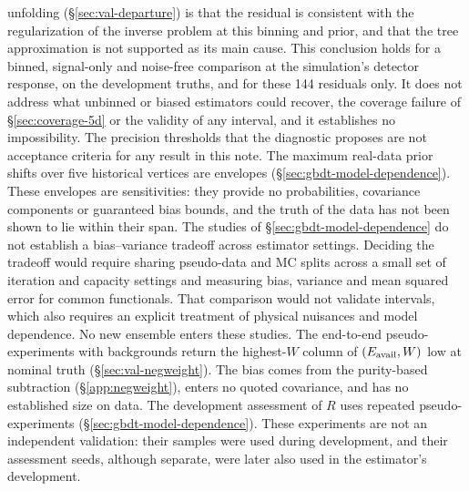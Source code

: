 unfolding (\S\ref{sec:val-departure}) is that the residual is consistent with the regularization of the inverse problem at this binning and prior, and that the tree approximation is not supported as its main cause. This conclusion holds for a binned, signal-only and noise-free comparison at the simulation's detector response, on the development truths, and for these 144 residuals only. It does not address what unbinned or biased estimators could recover, the coverage failure of \S\ref{sec:coverage-5d} or the validity of any interval, and it establishes no impossibility. The precision thresholds that the diagnostic proposes are not acceptance criteria for any result in this note. The maximum real-data prior shifts over five historical vertices are envelopes (\S\ref{sec:gbdt-model-dependence}). These envelopes are sensitivities: they provide no probabilities, covariance components or guaranteed bias bounds, and the truth of the data has not been shown to lie within their span. The studies of \S\ref{sec:gbdt-model-dependence} do not establish a bias--variance tradeoff across estimator settings. Deciding the tradeoff would require sharing pseudo-data and MC splits across a small set of iteration and capacity settings and measuring bias, variance and mean squared error for common functionals. That comparison would not validate intervals, which also requires an explicit treatment of physical nuisances and model dependence. No new ensemble enters these studies. The end-to-end pseudo-experiments with backgrounds return the highest-$W$ column of $(E_{\mathrm{avail}},W)$ low at nominal truth (\S\ref{sec:val-negweight}). The bias comes from the purity-based subtraction (\S\ref{app:negweight}), enters no quoted covariance, and has no established size on data. The development assessment of $R$ uses repeated pseudo-experiments (\S\ref{sec:gbdt-model-dependence}). These experiments are not an independent validation: their samples were used during development, and their assessment seeds, although separate, were later also used in the estimator's development.
